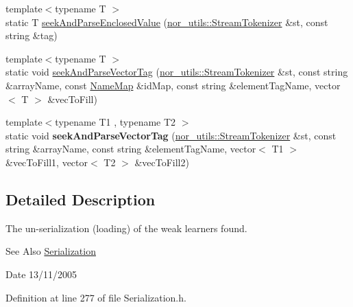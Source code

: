 \begin{DoxyCompactItemize}
\item 
{\footnotesize template$<$typename T $>$ }\\static T \hyperlink{classMultiBoost_1_1UnSerialization_a5670d7bfe5a56885d9c61739256e2146}{seek\-And\-Parse\-Enclosed\-Value} (\hyperlink{classnor__utils_1_1StreamTokenizer}{nor\-\_\-utils\-::\-Stream\-Tokenizer} \&st, const string \&tag)
\item 
{\footnotesize template$<$typename T $>$ }\\static void \hyperlink{classMultiBoost_1_1UnSerialization_a36dfaae8f144cef020bd6706d25b27cc}{seek\-And\-Parse\-Vector\-Tag} (\hyperlink{classnor__utils_1_1StreamTokenizer}{nor\-\_\-utils\-::\-Stream\-Tokenizer} \&st, const string \&array\-Name, const \hyperlink{classMultiBoost_1_1NameMap}{Name\-Map} \&id\-Map, const string \&element\-Tag\-Name, vector$<$ T $>$ \&vec\-To\-Fill)
\item 
\hypertarget{classMultiBoost_1_1UnSerialization_acc551427f65af0adb764758087410cb5}{{\footnotesize template$<$typename T1 , typename T2 $>$ }\\static void {\bfseries seek\-And\-Parse\-Vector\-Tag} (\hyperlink{classnor__utils_1_1StreamTokenizer}{nor\-\_\-utils\-::\-Stream\-Tokenizer} \&st, const string \&array\-Name, const string \&element\-Tag\-Name, vector$<$ T1 $>$ \&vec\-To\-Fill1, vector$<$ T2 $>$ \&vec\-To\-Fill2)}\label{classMultiBoost_1_1UnSerialization_acc551427f65af0adb764758087410cb5}

\end{DoxyCompactItemize}


\subsection{Detailed Description}
The un-\/serialization (loading) of the weak learners found. \begin{DoxySeeAlso}{See Also}
\hyperlink{classMultiBoost_1_1Serialization}{Serialization} 
\end{DoxySeeAlso}
\begin{DoxyDate}{Date}
13/11/2005 
\end{DoxyDate}


Definition at line 277 of file Serialization.\-h.



